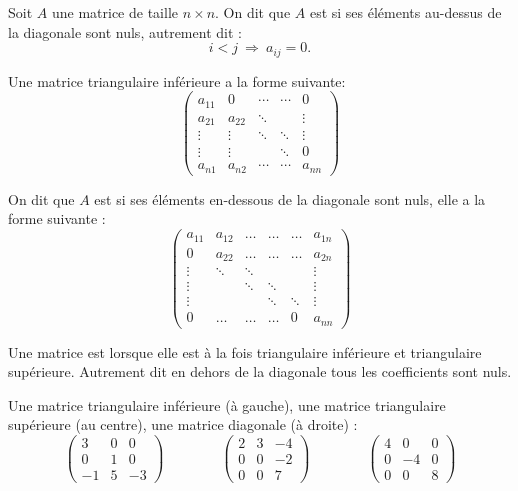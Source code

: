 \documentclass[11pt,class=report,crop=false]{standalone}
\begin{document}

Soit $A$ une matrice de taille $n \times n$. On dit que $A$ est 
si ses éléments au-dessus de la diagonale sont nuls, autrement dit :
$$
i < j \  \Longrightarrow \ a_{ij} = 0.$$

Une matrice triangulaire inférieure a la forme suivante:
$$\begin{pmatrix}
	a_{11} & 0 &\cdots&\cdots& 0\\
	a_{21}&a_{22}&\ddots&&\vdots\\
	\vdots&\vdots&\ddots&\ddots&\vdots\\
	\vdots & \vdots &&\ddots&0\\
	a_{n1}&a_{n2}&\cdots&\cdots&a_{nn}
\end{pmatrix}
$$

\bigskip

On dit que $A$ est  si ses éléments en-dessous
de la diagonale sont nuls, elle a la forme suivante :
$$\begin{pmatrix}
	a_{11} & a_{12} &\dots&\dots&\dots & a_{1n}\\
	0&a_{22}&\dots&\dots&\dots&a_{2n}\\
	\vdots&\ddots&\ddots&&&\vdots\\
	\vdots&&\ddots&\ddots&&\vdots\\
	\vdots & &&\ddots&\ddots&\vdots\\
	0&\dots&\dots&\dots&0&a_{nn}
\end{pmatrix}
$$

Une matrice est 
lorsque elle est à la fois triangulaire inférieure et triangulaire supérieure.
Autrement dit en dehors de la diagonale tous les coefficients sont nuls.

\begin{exemple}
	Une matrice triangulaire inférieure (à gauche), une matrice triangulaire supérieure (au centre), une matrice diagonale (à droite) :
	$$
	\begin{pmatrix}
		3 & 0 & 0\\
		0 & 1 & 0\\
		-1 & 5 & -3
	\end{pmatrix}\qquad\qquad
	\begin{pmatrix}
		2 & 3 & -4\\
		0 & 0 & -2\\
		0 & 0 & 7
	\end{pmatrix}\qquad\qquad
	\begin{pmatrix}
		4 &  0 & 0\\
		0 & -4 & 0\\
		0 & 0  & 8
	\end{pmatrix}$$
\end{exemple}
\end{document}
